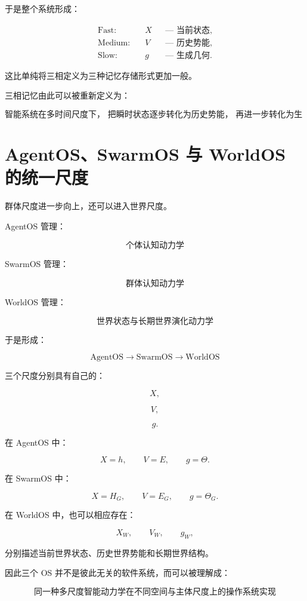 于是整个系统形成：

\[
\boxed{
\begin{aligned}
\text{Fast:}\quad
&X
&&\text{--- 当前状态},\\
\text{Medium:}\quad
&V
&&\text{--- 历史势能},\\
\text{Slow:}\quad
&g
&&\text{--- 生成几何}.
\end{aligned}
}
\]

这比单纯将三相定义为三种记忆存储形式更加一般。

三相记忆由此可以被重新定义为：

\[
\boxed{
\text{智能系统在多时间尺度下，
把瞬时状态逐步转化为历史势能，
再进一步转化为生成几何的动力学过程}
}
\]


\section{AgentOS、SwarmOS 与 WorldOS 的统一尺度}

群体尺度进一步向上，还可以进入世界尺度。

AgentOS 管理：

\[
\boxed{
\text{个体认知动力学}
}
\]

SwarmOS 管理：

\[
\boxed{
\text{群体认知动力学}
}
\]

WorldOS 管理：

\[
\boxed{
\text{世界状态与长期世界演化动力学}
}
\]

于是形成：

\[
\boxed{
\mathrm{AgentOS}
\rightarrow
\mathrm{SwarmOS}
\rightarrow
\mathrm{WorldOS}
}
\]

三个尺度分别具有自己的：

\[
X,
\]

\[
V,
\]

\[
g.
\]

在 AgentOS 中：

\[
X=h,
\qquad
V=E,
\qquad
g=\Theta.
\]

在 SwarmOS 中：

\[
X=H_G,
\qquad
V=E_G,
\qquad
g=\Theta_G.
\]

在 WorldOS 中，也可以相应存在：

\[
X_W,
\qquad
V_W,
\qquad
g_W,
\]

分别描述当前世界状态、历史世界势能和长期世界结构。

因此三个 OS 并不是彼此无关的软件系统，而可以被理解成：

\[
\boxed{
\text{同一种多尺度智能动力学在不同空间与主体尺度上的操作系统实现}
}
\]



